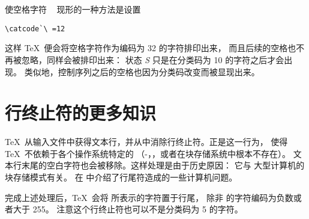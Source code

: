 \documentclass{book}
\begin{document}
使空格字符 \verb*- - 现形的一种方法是设置
\begin{verbatim}
\catcode`\ =12
\end{verbatim}
这样 \TeX\  便会将空格字符作为编码为 32 的字符排印出来，
而且后续的空格也不再被忽略，同样会被排印出来：
状态 {\itshape S} 只是在分类码为 10 的字符之后才会出现。
类似地，控制序列之后的空格也因为分类码改变而被显现出来。

\section{行终止符的更多知识}

\TeX\ 从输入文件中获得文本行，并从中消除行终止符。正是这一行为，
使得 \TeX\ 不依赖于各个操作系统特定的%
（-，，或者在块存储系统中根本不存在）。
文本行末尾的空白字符也会被移除。这样处理是由于历史原因：
它与  大型计算机的块存储模式有关。
在 \cite{B:ctrl-M} 中介绍了行尾符造成的一些计算机问题。

完成上述处理后，\TeX\ 会将  所表示的字符置于行尾，
除非  的字符编码为负数或者大于 255。
注意这个行终止符也可以不是分类码为 5 的字符。
\end{document}
